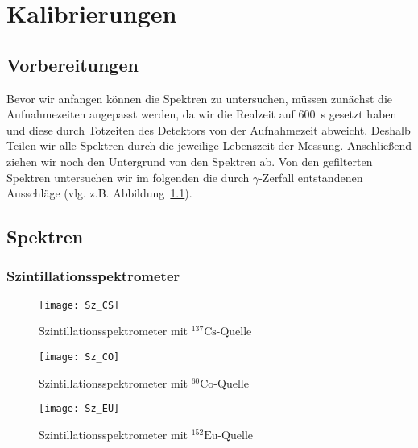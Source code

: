\documentclass[11pt, ngerman, fleqn, DIV=15, headinclude, BCOR=2cm]{scrreprt}
\newcommand{\plotwidth}{0.8\linewidth}
\begin{document}
\chapter{Kalibrierungen}

\section{Vorbereitungen}

Bevor wir anfangen können die Spektren zu untersuchen, müssen zunächst die
Aufnahmezeiten angepasst werden, da wir die Realzeit auf \SI{600}{\second} gesetzt
haben und diese durch Totzeiten des Detektors von der Aufnahmezeit abweicht.
Deshalb Teilen wir alle Spektren durch die jeweilige Lebenszeit der Messung.
Anschließend ziehen wir noch den Untergrund von den Spektren 
ab. Von den gefilterten Spektren untersuchen wir im folgenden die durch
$\gamma$-Zerfall entstandenen Ausschläge (vlg. z.B. Abbildung~\ref{fig:Sz_CS}).


\section{Spektren}
\subsection{Szintillationsspektrometer}

\begin{figure}[htbp]
	\centering
	\texttt{[image: Sz\_CS]}
	\caption{%
            Szintillationsspektrometer mit $^{137}\text{Cs}$-Quelle
	}
	\label{fig:Sz_CS}
\end{figure}
\begin{figure}[htbp]
	\centering
	\texttt{[image: Sz\_CO]}
	\caption{%
            Szintillationsspektrometer mit $^{60}\text{Co}$-Quelle
	}
	\label{fig:Sz_CO}
\end{figure}
\begin{figure}[htbp]
	\centering
	\texttt{[image: Sz\_EU]}
	\caption{%
            Szintillationsspektrometer mit $^{152}\text{Eu}$-Quelle
	}
	\label{fig:Sz_EU}
\end{figure}
\end{document}
